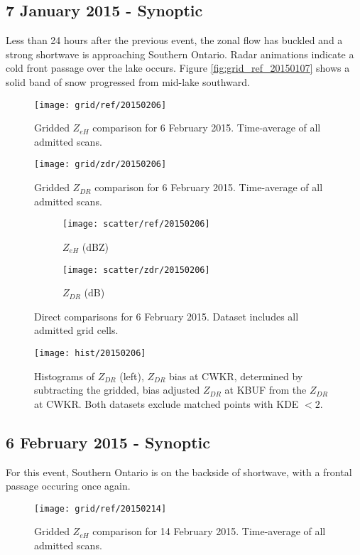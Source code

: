 \subsection{7 January 2015 - Synoptic}
Less than 24 hours after the previous event, the zonal flow has buckled and a strong shortwave is approaching Southern Ontario. Radar animations indicate a cold front passage over the lake occurs.
Figure \ref{fig:grid_ref_20150107} shows a solid band of snow progressed from mid-lake southward.
\begin{figure}[p]
\texttt{[image: grid/ref/20150206]}
\caption{Gridded $Z_{eH}$ comparison for 6 February 2015. Time-average of all admitted scans.} 
\label{fig:grid_ref_20150206}
\end{figure}

\begin{figure}[p]
\texttt{[image: grid/zdr/20150206]}
\caption{Gridded $Z_{DR}$ comparison for 6 February 2015. Time-average of all admitted scans.} 
\label{fig:grid_zdr_20150206}
\end{figure}

\begin{figure}[p]
\centering
   \begin{subfigure}{0.49\linewidth} \centering
     \texttt{[image: scatter/ref/20150206]}
     \caption{$Z_{eH}$ (dBZ)}\label{fig:scatter_ref_20150206}
   \end{subfigure}
   \begin{subfigure}{0.49\linewidth} \centering
     \texttt{[image: scatter/zdr/20150206]}
     \caption{$Z_{DR}$ (dB)}\label{fig:scatter_zdr_20150206}
   \end{subfigure}
\caption{Direct comparisons for 6 February 2015. Dataset includes all admitted grid cells.} \label{fig:scatter_20150206}
\end{figure}

\begin{figure}[p]
\texttt{[image: hist/20150206]}\centering
\caption{Histograms of $Z_{DR}$ (left), $Z_{DR}$ bias at CWKR, determined by subtracting the gridded, bias adjusted $Z_{DR}$ at KBUF from the $Z_{DR}$ at CWKR. Both datasets exclude matched points with KDE $< 2$. } 
\label{fig:hist_20150206}
\end{figure}


\subsection{6 February 2015 - Synoptic}
For this event, Southern Ontario is on the backside of shortwave, with a frontal passage occuring once again.
\begin{figure}[p]
\texttt{[image: grid/ref/20150214]}
\caption{Gridded $Z_{eH}$ comparison for 14 February 2015. Time-average of all admitted scans.} 
\label{fig:grid_ref_20150214}
\end{figure}

